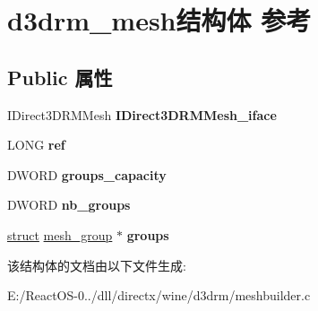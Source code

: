 \hypertarget{structd3drm__mesh}{}\section{d3drm\+\_\+mesh结构体 参考}
\label{structd3drm__mesh}
\subsection*{Public 属性}
\begin{DoxyCompactItemize}
\item 
\mbox{\label{structd3drm__mesh_a9a5c6f2f1fafcc81471bd22d0eb8dc90}} 
I\+Direct3\+D\+R\+M\+Mesh {\bfseries I\+Direct3\+D\+R\+M\+Mesh\+\_\+iface}
\item 
\mbox{\label{structd3drm__mesh_ae459356be00faaec11046a9f622cf815}} 
L\+O\+NG {\bfseries ref}
\item 
\mbox{\label{structd3drm__mesh_a7f5c11f9e5f66e0fa54b6b77df6bf0d4}} 
D\+W\+O\+RD {\bfseries groups\+\_\+capacity}
\item 
\mbox{\label{structd3drm__mesh_a7d746d48f63bf13200346b2cbdaba231}} 
D\+W\+O\+RD {\bfseries nb\+\_\+groups}
\item 
\mbox{\label{structd3drm__mesh_a7cdd8b13288c13f02465ca324c32e4a8}} 
\hyperlink{interfacestruct}{struct} \hyperlink{structmesh__group}{mesh\+\_\+group} $\ast$ {\bfseries groups}
\end{DoxyCompactItemize}


该结构体的文档由以下文件生成\+:\begin{DoxyCompactItemize}
\item 
E\+:/\+React\+O\+S-\/0../dll/directx/wine/d3drm/meshbuilder.\+c\end{DoxyCompactItemize}
